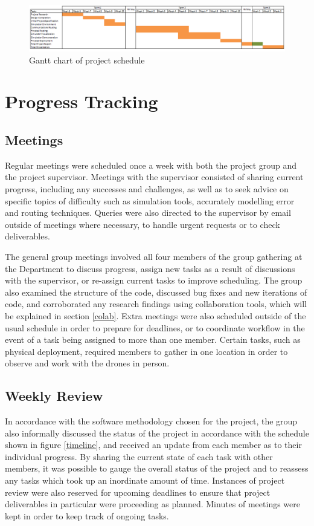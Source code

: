 \begin{figure}
\centering	
\includegraphics[scale=1,angle=90]{img/progantt.png}
\caption{Gantt chart of project schedule}
\label{gantt}
\end{figure}

\section{Progress Tracking}

\subsection{Meetings}
Regular meetings were scheduled once a week with both the project group and the project supervisor. Meetings with the supervisor consisted of sharing current progress, including any successes and challenges, as well as to seek advice on specific topics of difficulty such as simulation tools, accurately modelling error and routing techniques. Queries were also directed to the supervisor by email outside of meetings where necessary, to handle urgent requests or to check deliverables. 

The general group meetings involved all four members of the group gathering at the Department to discuss progress, assign new tasks as a result of discussions with the supervisor, or re-assign current tasks to improve scheduling. The group also examined the structure of the code, discussed bug fixes and new iterations of code, and corroborated any research findings using collaboration tools, which will be explained in section \ref{colab}. Extra meetings were also scheduled outside of the usual schedule in order to prepare for deadlines, or to coordinate workflow in the event of a task being assigned to more than one member. Certain tasks, such as physical deployment, required members to gather in one location in order to observe and work with the drones in person.

\subsection{Weekly Review}
In accordance with the software methodology chosen for the project, the group also informally discussed the status of the project in accordance with the schedule shown in figure \ref{timeline}, and received an update from each member as to their individual progress. By sharing the current state of each task with other members, it was possible to gauge the overall status of the project and to reassess any tasks which took up an inordinate amount of time. Instances of project review were also reserved for upcoming deadlines to ensure that project deliverables in particular were proceeding as planned. Minutes of meetings were kept in order to keep track of ongoing tasks.

